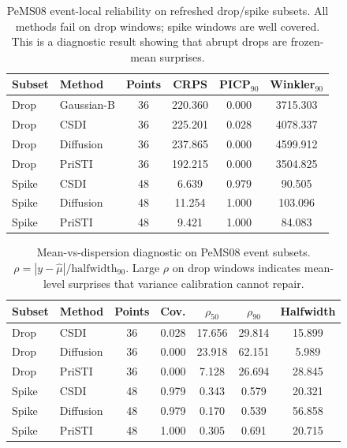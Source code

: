 \documentclass[letterpaper,journal]{IEEEtran}
\begin{document}
\begin{table}[t]
\centering
\caption{PeMS08 event-local reliability on refreshed drop/spike subsets.
All methods fail on drop windows; spike windows are well covered.  This is
a diagnostic result showing that abrupt drops are frozen-mean surprises.}
\label{tab:event_refresh}
\footnotesize
\begin{tabular}{llcccc}
\toprule
Subset & Method & Points & CRPS & PICP$_{90}$ & Winkler$_{90}$ \\
\midrule
Drop & Gaussian-B & 36 & 220.360 & 0.000 & 3715.303 \\
Drop & CSDI       & 36 & 225.201 & 0.028 & 4078.337 \\
Drop & Diffusion  & 36 & 237.865 & 0.000 & 4599.912 \\
Drop & PriSTI     & 36 & 192.215 & 0.000 & 3504.825 \\
Spike & CSDI      & 48 & 6.639   & 0.979 & 90.505  \\
Spike & Diffusion & 48 & 11.254  & 1.000 & 103.096 \\
Spike & PriSTI    & 48 & 9.421   & 1.000 & 84.083  \\
\bottomrule
\end{tabular}
\end{table}

\begin{table}[t]
\centering
\caption{Mean-vs-dispersion diagnostic on PeMS08 event subsets.
$\rho=|y-\hat{\mu}|/\mathrm{halfwidth}_{90}$.  Large $\rho$ on drop windows
indicates mean-level surprises that variance calibration cannot repair.}
\label{tab:rho_decomposition}
\scriptsize
\setlength{\tabcolsep}{2pt}
\begin{tabular}{@{}llccccc@{}}
\toprule
Subset & Method & Points & Cov. & $\rho_{50}$ & $\rho_{90}$ & Halfwidth \\
\midrule
Drop & CSDI      & 36 & 0.028 & 17.656 & 29.814 & 15.899 \\
Drop & Diffusion & 36 & 0.000 & 23.918 & 62.151 & 5.989  \\
Drop & PriSTI    & 36 & 0.000 & 7.128  & 26.694 & 28.845 \\
Spike & CSDI     & 48 & 0.979 & 0.343  & 0.579  & 20.321 \\
Spike & Diffusion& 48 & 0.979 & 0.170  & 0.539  & 56.858 \\
Spike & PriSTI   & 48 & 1.000 & 0.305  & 0.691  & 20.715 \\
\bottomrule
\end{tabular}
\end{table}
\end{document}
